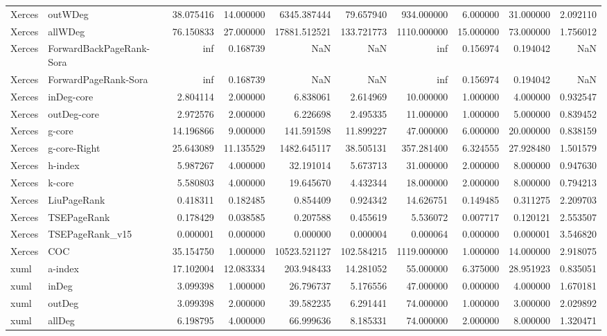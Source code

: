 \begin{tabular}{llrrrrrrrr}
Xerces & outWDeg & 38.075416 & 14.000000 & 6345.387444 & 79.657940 & 934.000000 & 6.000000 & 31.000000 & 2.092110 \\
Xerces & allWDeg & 76.150833 & 27.000000 & 17881.512521 & 133.721773 & 1110.000000 & 15.000000 & 73.000000 & 1.756012 \\
Xerces & ForwardBackPageRank-Sora & inf & 0.168739 & NaN & NaN & inf & 0.156974 & 0.194042 & NaN \\
Xerces & ForwardPageRank-Sora & inf & 0.168739 & NaN & NaN & inf & 0.156974 & 0.194042 & NaN \\
Xerces & inDeg-core & 2.804114 & 2.000000 & 6.838061 & 2.614969 & 10.000000 & 1.000000 & 4.000000 & 0.932547 \\
Xerces & outDeg-core & 2.972576 & 2.000000 & 6.226698 & 2.495335 & 11.000000 & 1.000000 & 5.000000 & 0.839452 \\
Xerces & g-core & 14.196866 & 9.000000 & 141.591598 & 11.899227 & 47.000000 & 6.000000 & 20.000000 & 0.838159 \\
Xerces & g-core-Right & 25.643089 & 11.135529 & 1482.645117 & 38.505131 & 357.281400 & 6.324555 & 27.928480 & 1.501579 \\
Xerces & h-index & 5.987267 & 4.000000 & 32.191014 & 5.673713 & 31.000000 & 2.000000 & 8.000000 & 0.947630 \\
Xerces & k-core & 5.580803 & 4.000000 & 19.645670 & 4.432344 & 18.000000 & 2.000000 & 8.000000 & 0.794213 \\
Xerces & LiuPageRank & 0.418311 & 0.182485 & 0.854409 & 0.924342 & 14.626751 & 0.149485 & 0.311275 & 2.209703 \\
Xerces & TSEPageRank & 0.178429 & 0.038585 & 0.207588 & 0.455619 & 5.536072 & 0.007717 & 0.120121 & 2.553507 \\
Xerces & TSEPageRank_v15 & 0.000001 & 0.000000 & 0.000000 & 0.000004 & 0.000064 & 0.000000 & 0.000001 & 3.546820 \\
Xerces & COC & 35.154750 & 1.000000 & 10523.521127 & 102.584215 & 1119.000000 & 1.000000 & 14.000000 & 2.918075 \\
xuml & a-index & 17.102004 & 12.083334 & 203.948433 & 14.281052 & 55.000000 & 6.375000 & 28.951923 & 0.835051 \\
xuml & inDeg & 3.099398 & 1.000000 & 26.796737 & 5.176556 & 47.000000 & 0.000000 & 4.000000 & 1.670181 \\
xuml & outDeg & 3.099398 & 2.000000 & 39.582235 & 6.291441 & 74.000000 & 1.000000 & 3.000000 & 2.029892 \\
xuml & allDeg & 6.198795 & 4.000000 & 66.999636 & 8.185331 & 74.000000 & 2.000000 & 8.000000 & 1.320471 \\

\end{tabular}
